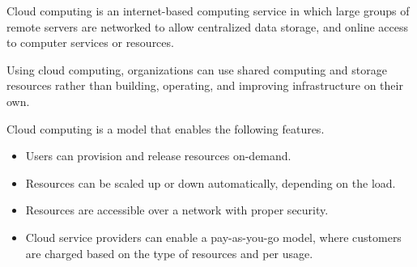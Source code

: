 Cloud computing is an internet-based computing service in which large groups of remote servers are
networked to allow centralized data storage, and online access to computer services or resources.

Using cloud computing, organizations can use shared computing and storage resources rather than building,
operating, and improving infrastructure on their own.

Cloud computing is a model that enables the following features.

\begin{itemize}
    \item Users can provision and release resources on-demand.
    \item Resources can be scaled up or down automatically, depending on the load.
    \item  Resources are accessible over a network with proper security.
    \item Cloud service providers can enable a pay-as-you-go model, where customers are charged based on
the type of resources and per usage.
\end{itemize}





